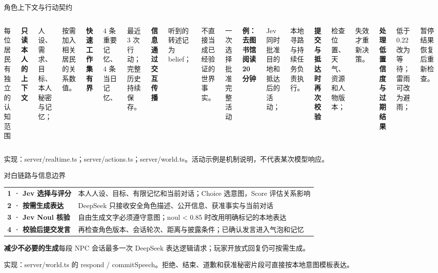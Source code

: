 \documentclass[aspectratio=169,10pt,fontset=fandol]{ctexbeamer}
\newcommand{\source}[1]{\vfill{\fontsize{6.3}{8}\selectfont\color{Muted}#1\par}}
\newcommand{\lead}[1]{{\large\color{Forest}#1}\par\medskip}
\newcommand{\key}[1]{\textbf{\color{Forest}#1}}
\newcommand{\jev}[1]{\textbf{\color{Jev}#1}}
\newcommand{\ds}[1]{\textbf{\color{DS}#1}}
\newcommand{\point}[2]{\key{#1}\par{\small #2}\par\medskip}
\begin{document}
\begin{frame}{角色上下文与行动契约}
\begin{columns}[T,onlytextwidth]
\lead{每位居民有独立的认知范围}
\point{只读本人的上下文}{人设、需求、目标、本人秘密与记忆；\par 按需加入相关居民的关系数值。}
\point{快速工作集有界}{4 条重要记忆、4 条当日记忆、\par 最近 3 次行动；完整历史持续保存。}
\point{信息通过交互传播}{听到的转述记为 belief；\par 不直接当成已经验证的世界事实。}
\lead{一次选择批准完整活动}
\point{例：去图书馆阅读 20 分钟}{Jev 同时批准目的地和抵达后的活动；\par 本地寻路与持续任务负责执行。}
\point{提交与抵达时再次校验}{检查位置、天气、资源和人物版本；\par 失效才重新决策。}
\point{处理低置信度与过期结果}{低于 0.22 改为等待；雷雨可改为避雨；\par 暂停结果恢复后重新检查。}
\end{columns}
\source{实现：server/realtime.ts；server/actions.ts；server/world.ts。活动示例是机制说明，不代表某次模型响应。}
\end{frame}

\begin{frame}{对白链路与信息边界}
\relax
{\small
\begin{tabularx}{\linewidth}{@{}p{3.0cm}Y@{}}
\toprule
\jev{1 · Jev 选择与评分} & 本人人设、目标、有限记忆和当前对话；Choice 选意图，Score 评估关系影响\\[1mm]
\ds{2 · 按需生成表达} & DeepSeek 只接收安全角色描述、公开信息、获准事实与当前对话\\[1mm]
\jev{3 · Jev Noul 核验} & 自由生成文字必须遵守意图；noul < 0.85 时改用明确标记的本地表达\\[1mm]
\key{4 · 校验后提交发言} & 再检查角色版本、会话轮次、距离与披露条件；已确认发言进入气泡和记忆\\
\bottomrule
\end{tabularx}}\par
\medskip
\key{减少不必要的生成}\quad 每段 NPC 会话最多一次 DeepSeek 表达逻辑请求；玩家开放式回复仍可按需生成。
\source{实现：server/world.ts 的 respond / commitSpeech。拒绝、结束、道歉和获准秘密片段可直接按本地意图模板表达。}
\end{frame}
\end{document}
